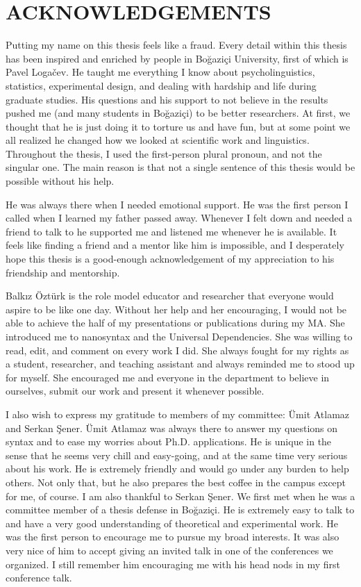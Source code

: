 \chapter*{\MakeUppercase{acknowledgements}}

Putting my name on this thesis feels like a fraud. Every detail within this thesis has been inspired and enriched by people in Bo\u{g}azi\c{c}i University, first of which is Pavel Loga\v{c}ev. He taught me everything I know about psycholinguistics, statistics, experimental design, and dealing with hardship and life during graduate studies. His questions and his support to not believe in the results pushed me (and many students in Bo\u{g}azi\c{c}i) to be better researchers. At first, we thought that he is just doing it to torture us and have fun, but at some point we all realized he changed how we looked at scientific work and linguistics. Throughout the thesis, I used the first-person plural pronoun, and not the singular one. The main reason is that not a single sentence of this thesis would be possible without his help.

He was always there when I needed emotional support. He was the first person I called when I learned my father passed away. Whenever I felt down and needed a friend to talk to he supported me and listened me whenever he is available. It feels like finding a friend and a mentor like him is impossible, and I desperately hope this thesis is a good-enough acknowledgement of my appreciation to his friendship and mentorship. 

Balk{\i}z \"Ozt\"urk is the role model educator and researcher that everyone would aspire to be like one day. Without her help and her encouraging, I would not be able to achieve the half of my presentations or publications during my MA. She introduced me to nanosyntax and the Universal Dependencies. She was willing to read, edit, and comment on every work I did. She always fought for my rights as a student, researcher, and teaching assistant and always reminded me to stood up for myself. She encouraged me and everyone in the department to believe in ourselves, submit our work and present it whenever possible.

I also wish to express my gratitude to members of my committee: \"Umit Atlamaz and Serkan \c{S}ener. \"Umit Atlamaz was always there to answer my questions on syntax and to ease my worries about Ph.D. applications. He is unique in the sense that he seems very chill and easy-going, and at the same time very serious about his work. He is extremely friendly and would go under any burden to help others. Not only that, but he also prepares the best coffee in the campus except for me, of course. I am also thankful to Serkan \c{S}ener. We first met when he was a committee member of a thesis defense in Bo\u{g}azi\c{c}i. He is extremely easy to talk to and have a very good understanding of theoretical and experimental work. He was the first person to encourage me to pursue my broad interests. It was also very nice of him to accept giving an invited talk in one of the conferences we organized. I still remember him encouraging me with his head nods in my first conference talk.

